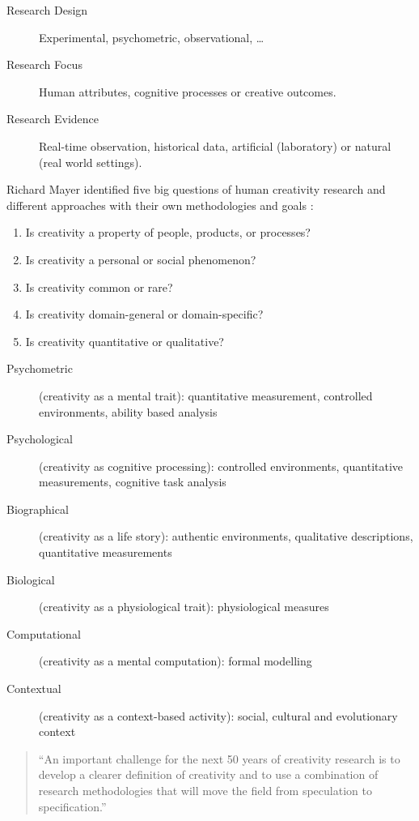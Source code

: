 \begin{description}
  \item [Research Design] Experimental, psychometric, observational, \ldots
  \item [Research Focus] Human attributes, cognitive processes or creative outcomes.
  \item [Research Evidence] Real-time observation, historical data, artificial (laboratory) or natural (real world settings).
\end{description}

Richard Mayer identified five big questions of human creativity research and different approaches with their own methodologies and goals \autocite[p.450-451,453]{Mayer1999}:

\label{s:Mayer5questions}
\begin{enumerate}
  \item Is creativity a property of people, products, or processes?
  \item Is creativity a personal or social phenomenon?
  \item Is creativity common or rare?
  \item Is creativity domain-general or domain-specific?
  \item Is creativity quantitative or qualitative?
\end{enumerate}

\begin{description}
  \item [Psychometric] (creativity as a mental trait): quantitative measurement, controlled environments, ability based analysis
  \item [Psychological] (creativity as cognitive processing): controlled environments, quantitative measurements, cognitive task analysis
  \item [Biographical] (creativity as a life story): authentic environments, qualitative descriptions, quantitative measurements
  \item [Biological] (creativity as a physiological trait): physiological measures
  \item [Computational] (creativity as a mental computation): formal modelling
  \item [Contextual] (creativity as a context-based activity): social, cultural and evolutionary context
\end{description}

\begin{quote}
  ``An important challenge for the next 50 years of creativity research is to develop a clearer definition of creativity and to use a combination of research methodologies that will move the field from speculation to specification.'' \autocite[p.459]{Mayer1999}
\end{quote}

